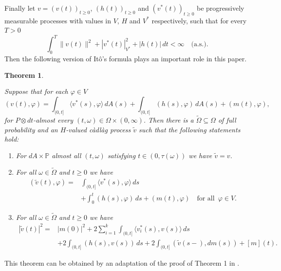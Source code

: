 \documentclass[11pt,reqno]{amsart}
\newtheorem{theorem}{Theorem}[section]
\theoremstyle{definition}
\theoremstyle{remark}
\newcommand{\<}{\langle}
\renewcommand{\>}{\rangle}
\renewcommand{\P}{\mathbb{P}}
\begin{document}
Finally let $v=(v(t))_{t\geq0}$, $(h(t))_{t\geq0}$ and $(v^{\ast}(t))_{t\geq0}$  
be progressively measurable processes with values in $V$, $H$ and $V^{\ast}$  
respectively, such that for every $T>0$
$$
\int_0^T\|v(t)\|^2+|v^{\ast}(t)|^2_{V^{\ast}}+|h(t)|\,dt<\infty\quad\text{(a.s.)}.
$$
Then the following version of It\^o's formula plays an important role 
in this paper.  

\begin{theorem}
                                            \label{theorem0}

Suppose that for each $\varphi \in V$ 
\begin{equation}
                                                                                     \label{eq:1}
(v(t),\varphi)=
\int_{(0,t]}\langle v^{\ast}(s),\varphi\rangle\, dA(s) 
+\int_{(0,t]}(h(s),\varphi)\, dA(s)
+ (m(t),\varphi), 
\end{equation}
for $P\otimes dt$-almost every $(t,\omega)\in\Omega\times(0,\infty)$. 
Then there is a $\tilde\Omega\subseteq\Omega$ of full probability 
and
an $H$-valued c\`adl\`ag process $\tilde v$ such that 
the following statements hold: 
\begin{enumerate}
\item[(i)] For $dA\times \P$ almost all $(t, \omega)$ 
satisfying $t \in (0,\tau(\omega))$ we have $\tilde v=v$.
\item[(ii)] For all $\omega \in \tilde{\Omega}$ 
and $t\geq0$ we have
\begin{align}            
(\tilde v(t),\varphi)= &
 \int_{(0,t]}\langle v^{\ast}(s),\varphi\rangle\,ds                      \nonumber\\
 &+\int_0^t(h(s),\varphi)\,ds
 + (m(t),\varphi)\quad \textrm{for all }\, \varphi \in V.                \nonumber
\end{align}
\item[(iii)] For all $\omega \in \tilde{\Omega}$ and $t\geq0$ we have 
\begin{align}
|\tilde v(t)|^2  = 
& |m(0)|^2 + 2\sum_{i=1}^k\int_{(0,t]}\langle v^{\ast}_i(s),v(s)\rangle\,ds\nonumber\\ 
& +2 \int_{(0,t]}(h(s),v(s))\,ds+ 2\int_{(0,t]}( \tilde v(s-),dm(s))
+ [m](t). \nonumber 
\end{align}
\end{enumerate}
\end{theorem}

\smallskip
\noindent
This theorem can be obtained by an adaptation of the proof 
of Theorem 1 in \cite{GK1982}. 
\end{document}

